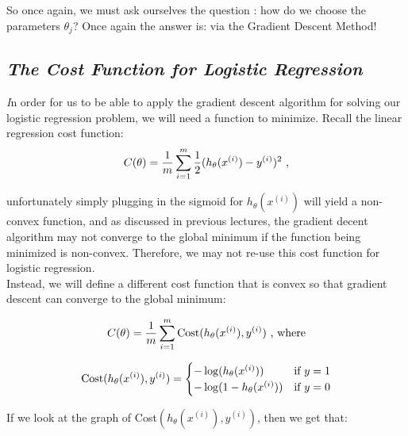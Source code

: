 \documentclass[11pt,a4paper,oneside]{report}
\begin{document}
So once again, we must ask ourselves the question : how do we choose the parameters $\theta_j$? Once again the answer is: via the Gradient Descent Method!

{\center\color{magenta}
\subsection*{\it\huge The Cost Function for Logistic Regression}}

{\it\huge I}n order for us to be able to apply the gradient descent algorithm for solving our logistic regression problem, we will need a function to minimize. Recall the linear regression cost function:
\[
C(\theta) = \frac{1}{m}\sum\limits_{i=1}^m \frac{1}{2}(h_{\theta} (x^{(i)}) - y^{(i)})^2 \textnormal{ ,}
\]

unfortunately simply plugging in the sigmoid for $h_{\theta} (x^{(i)})$ will yield a non-convex function, and as discussed in previous lectures, the gradient decent algorithm may not converge to the global minimum if the function being minimized is non-convex. Therefore, we may not re-use this cost function for logistic regression.\\

Instead, we will define a different cost function that is convex so that gradient descent can converge to the global minimum:
\begin{framed}
\[
C(\theta) = \frac{1}{m}\sum\limits_{i=1}^m \textnormal{Cost}(h_{\theta} (x^{(i)}), y^{(i)}) \textnormal{ , where}
\]

\[
\textnormal{Cost}(h_{\theta} (x^{(i)}), y^{(i)}) = 
\begin{cases}
-\log(h_{\theta} (x^{(i)})) & \textnormal{if } y = 1 \\
-\log(1 - h_{\theta} (x^{(i)})) & \textnormal{if } y = 0
\end{cases}
\]
\end{framed}

If we look at the graph of Cost$(h_{\theta} (x^{(i)}), y^{(i)})$, then we get that:\\
\end{document}
